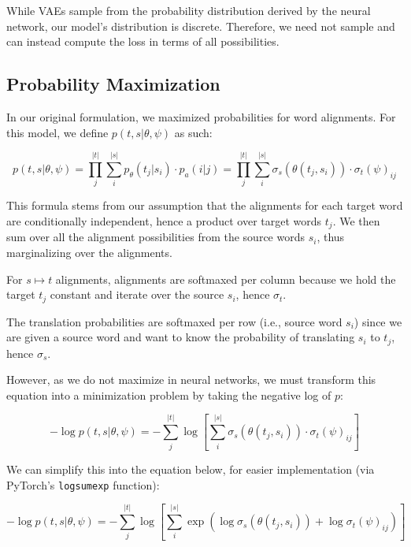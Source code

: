 \documentclass[twoside,twocolumn]{article}
\newlength\mystoreparindent
\newenvironment{myparindent}[1]{%
  \setlength{\mystoreparindent}{\the\parindent}
  \setlength{\parindent}{#1}
  }{%
  \setlength{\parindent}{\mystoreparindent}
}
\begin{document}
\begin{myparindent}{0pt}
While VAEs sample from the probability distribution derived by the neural
network, our model's distribution is discrete. Therefore, we need not
sample and can instead compute the loss in terms of all possibilities.

\subsection{Probability Maximization}

In our original formulation, we
maximized probabilities for word alignments.
For this model, we define $p(t, s | \theta, \psi)$ as such:

\begin{equation}
  p(t, s | \theta, \psi)
    = \prod_j^{|t|} \sum_i^{|s|} p_\theta(t_j| s_i) \cdot p_a(i|j)
    = \prod_j^{|t|} \sum_i^{|s|} \sigma_s(\theta(t_j, s_i)) \cdot \sigma_t(\psi)_{ij}
\end{equation}

This formula stems from our assumption that the alignments for each
target word are conditionally independent, hence a product over target
words $t_j$. We then sum over all the alignment possibilities from the source
words $s_i$, thus marginalizing over the alignments.

For $s \mapsto t$ alignments, alignments are softmaxed per column because we hold the target $t_j$ constant and iterate over the source $s_i$, hence $\sigma_t$.

The translation probabilities are softmaxed per row (i.e., source word $s_i$) since we are given a source word
and want to know the probability of translating $s_i$ to $t_j$, hence $\sigma_s$.

However, as we do not maximize in neural networks, we must transform this
equation into a minimization problem by taking the negative log of $p$:

\begin{equation}
  -\log p(t, s | \theta, \psi) =
  - \sum_j^{|t|}
     \log \left[ \sum_i^{|s|} \sigma_s \left( \theta(t_j, s_i) \right) \cdot
      \sigma_t(\psi)_{ij} \right]
\end{equation}

We can simplify this into the equation below, for easier implementation
(via PyTorch's \texttt{logsumexp} function):

\begin{equation}
  -\log  p(t , s | \theta, \psi) =
  - \sum_j^{|t|}  \log \left[ \sum_i^{|s|} \exp
      \left( \log \sigma_s(\theta(t_j, s_i)) + \log \sigma_t(\psi)_{ij} \right)
    \right]
\end{equation}


\end{myparindent}
\end{document}
